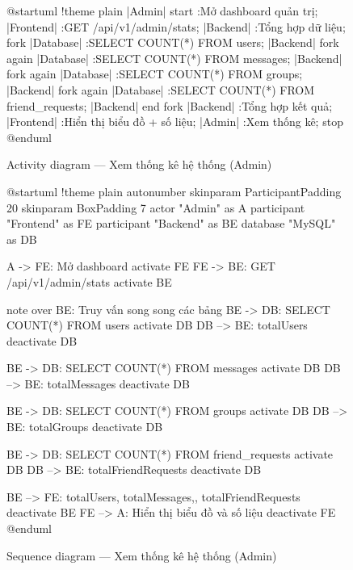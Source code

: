 \documentclass[12pt,a4paper]{report}
\begin{document}
\begin{figure}[H]
    \centering
    \begin{plantuml}
        @startuml
        !theme plain
        |Admin|
        start
        :Mở dashboard quản trị;
        |Frontend|
        :GET /api/v1/admin/stats;
        |Backend|
        :Tổng hợp dữ liệu;
        fork
          |Database|
          :SELECT COUNT(*) FROM users;
          |Backend|
        fork again
          |Database|
          :SELECT COUNT(*) FROM messages;
          |Backend|
        fork again
          |Database|
          :SELECT COUNT(*) FROM groups;
          |Backend|
        fork again
          |Database|
          :SELECT COUNT(*) FROM friend_requests;
          |Backend|
        end fork
        |Backend|
        :Tổng hợp kết quả;
        |Frontend|
        :Hiển thị biểu đồ + số liệu;
        |Admin|
        :Xem thống kê;
        stop
        @enduml
    \end{plantuml}
    \caption{Activity diagram --- Xem thống kê hệ thống (Admin)}
\end{figure}

\begin{figure}[H]
    \centering
    \begin{plantuml}
        @startuml
        !theme plain
        autonumber
        skinparam ParticipantPadding 20
        skinparam BoxPadding 7
        actor "Admin" as A
        participant "Frontend" as FE
        participant "Backend" as BE
        database "MySQL" as DB

        A -> FE: Mở dashboard
        activate FE
        FE -> BE: GET /api/v1/admin/stats
        activate BE

        note over BE: Truy vấn song song các bảng
        BE -> DB: SELECT COUNT(*) FROM users
        activate DB
        DB --> BE: totalUsers
        deactivate DB

        BE -> DB: SELECT COUNT(*) FROM messages
        activate DB
        DB --> BE: totalMessages
        deactivate DB

        BE -> DB: SELECT COUNT(*) FROM groups
        activate DB
        DB --> BE: totalGroups
        deactivate DB

        BE -> DB: SELECT COUNT(*) FROM friend_requests
        activate DB
        DB --> BE: totalFriendRequests
        deactivate DB

        BE --> FE: { totalUsers, totalMessages,\ntotalGroups, totalFriendRequests }
        deactivate BE
        FE --> A: Hiển thị biểu đồ và số liệu
        deactivate FE
        @enduml
    \end{plantuml}
    \caption{Sequence diagram --- Xem thống kê hệ thống (Admin)}
\end{figure}
\end{document}
